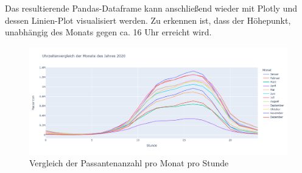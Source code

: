 Das resultierende Pandas-Dataframe kann anschließend wieder mit Plotly und dessen Linien-Plot visualisiert werden. Zu erkennen ist, dass der Höhepunkt, unabhängig des Monats gegen ca. 16 Uhr erreicht wird. 

\begin{figure}[h!]
    \vspace{0.2cm}
    \centering
    \includegraphics[width=\linewidth]{images/absHour.png}
    \caption{Vergleich der Passantenanzahl pro Monat pro Stunde}
    \label{fig:absStundenvergleich}
\end{figure}